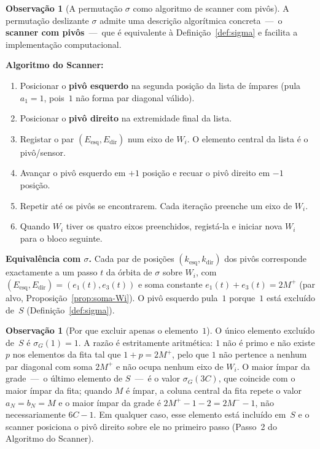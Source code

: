 \documentclass[12pt, a4paper]{article}
\theoremstyle{plain}
\theoremstyle{definition}
\newtheorem{remark}[theorem]{Observação}
\theoremstyle{remark}
\begin{document}
	\begin{remark}[A permutação $\sigma$ como algoritmo de scanner com pivôs]
		\label{rem:scanner-pivos}
		A permutação deslizante $\sigma$ admite uma descrição algorítmica
		concreta~---~o \textbf{scanner com pivôs}~---~que é equivalente à
		Definição~\ref{def:sigma} e facilita a implementação computacional.
		
		\medskip
		\noindent\textbf{Algoritmo do Scanner:}
		\begin{enumerate}
			\item Posicionar o \textbf{pivô esquerdo} na segunda posição
			da lista de ímpares (pula $a_1=1$, pois~$1$ não forma par
			diagonal válido).
			\item Posicionar o \textbf{pivô direito} na extremidade final
			da lista.
			\item Registar o par $(E_{\text{esq}},E_{\text{dir}})$ num
			eixo de $W_i$.  O elemento central da lista é o pivô/sensor.
			\item Avançar o pivô esquerdo em $+1$ posição e recuar o
			pivô direito em $-1$ posição.
			\item Repetir até os pivôs se encontrarem.  Cada iteração
			preenche um eixo de $W_i$.
			\item Quando $W_i$ tiver os quatro eixos preenchidos,
			registá-la e iniciar nova $W_i$ para o bloco seguinte.
		\end{enumerate}
		
		\noindent\textbf{Equivalência com $\sigma$.}  Cada par de
		posições $(k_{\text{esq}},k_{\text{dir}})$ dos pivôs corresponde
		exactamente a um passo $t$ da órbita de $\sigma$ sobre
		$W_i$, com $(E_{\text{esq}},E_{\text{dir}})=(e_1(t),e_3(t))$
		e soma constante $e_1(t)+e_3(t)=2M^+$ (par alvo,
		Proposição~\ref{prop:soma-Wi}).  O pivô esquerdo pula~$1$
		porque~$1$ está excluído de~$S$ (Definição~\ref{def:sigma}).
	\end{remark}
	
	\begin{remark}[Por que excluir apenas o elemento~$1$]
		\label{rem:extremos}
		O único elemento excluído de~$S$ é $\sigma_G(1)=1$.  A razão
		é estritamente aritmética: $1$ não é primo e não existe $p$
		nos elementos da fita tal que $1+p=2M^+$, pelo que $1$ não
		pertence a nenhum par diagonal com soma $2M^+$ e não ocupa
		nenhum eixo de $W_i$.  O maior ímpar da grade~---~o último
		elemento de $S$~---~é o valor $\sigma_G(3C)$, que coincide
		com o maior ímpar da fita; quando $M$ é ímpar, a coluna
		central da fita repete o valor $a_N=b_N=M$ e o maior ímpar
		da grade é $2M^+-1-2=2M^--1$, não necessariamente $6C-1$.
		Em qualquer caso, esse elemento está incluído em~$S$ e o
		scanner posiciona o pivô direito sobre ele no primeiro passo
		(Passo~2 do Algoritmo do Scanner).
	\end{remark}
	
\end{document}
